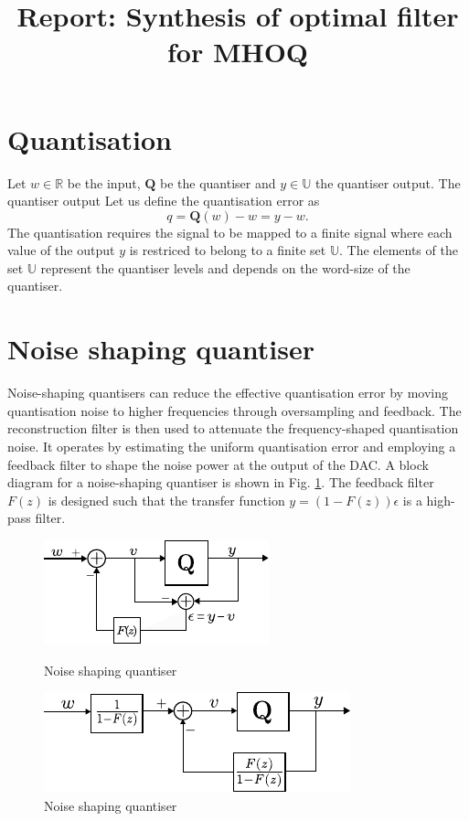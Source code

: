\documentclass[a4paper]{article}
\title{Report: Synthesis of optimal filter for MHOQ}
\begin{document}
\newpage
\maketitle
\tableofcontents

\section{Quantisation}
Let $w \in \mathbb{R}$ be the input, $\mathbf{Q}$ be the quantiser and $y \in \mathbb{U}$ the quantiser output. The quantiser output 
Let us define the quantisation error as 
\begin{equation}
	q = \mathbf{Q}(w) - w= y -w.
	\label{eq:error}
\end{equation}
The quantisation requires the signal to be mapped to a finite signal where each value of the output $y$ is restriced to belong to a finite set $\mathbb{U}$. The elements of the set $\mathbb{U}$ represent the quantiser levels and depends on the word-size of the quantiser. 

\section{Noise shaping quantiser}
Noise-shaping quantisers can reduce the effective quantisation error by moving quantisation noise to higher 
frequencies through oversampling and feedback.  The reconstruction filter is then used to attenuate the 
frequency-shaped quantisation noise. It operates by estimating the uniform quantisation error and employing a 
feedback filter to shape the noise power at the output of the DAC. A block diagram for a noise-shaping quantiser 
is shown in Fig. \ref{fig:dsm1}. The feedback filter $F(z)$ is designed such that the transfer 
function $y = (1 - F(z)) \epsilon$ is a high-pass filter.

\begin{figure}[!h]
	\centering
	\begin{minipage}{0.45\linewidth}
		\centering
		\includegraphics[scale = 1.5]{figures/noise_shaping2.pdf}
		\caption{Noise shaping quantiser}
		\label{fig:dsm}
	\end{minipage}
	\hfil  
	\begin{minipage}{0.45\linewidth}
		\centering
		\includegraphics[scale = 1.5]{figures/noise_shaping_redrawn.pdf}
		\caption{Noise shaping quantiser}
		\label{fig:dsm1}
	\end{minipage}
\end{figure}
\end{document}
